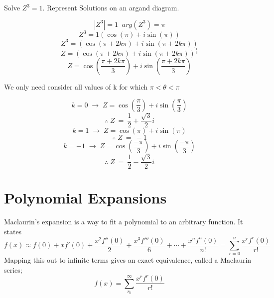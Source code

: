 \documentclass{article}
\begin{document}
Solve \(Z^3=1\). Represent Solutions on an argand diagram.

\[|Z^3|=1 \;\; arg(Z^3)=\pi\]
\[Z^3=1\left(\cos\left(\pi\right)+i\sin\left(\pi\right)\right)\]
\[Z^3=\left(\cos\left(\pi+2k\pi\right)+i\sin\left(\pi+2k\pi\right)\right)\]
\[Z=\left(\cos\left(\pi+2k\pi\right)+i\sin\left(\pi+2k\pi\right)\right)^{\frac{1}{3}}\]
\[Z=\cos\left(\frac{\pi+2k\pi}{3}\right)+i\sin\left(\frac{\pi+2k\pi}{3}\right)\]

\noindent We only need consider all values of k for which \(\pi<\theta<\pi\)

\[k=0 \;\rightarrow\; Z=\cos\left(\frac{\pi}{3}\right)+i\sin\left(\frac{\pi}{3}\right)\]
\[\therefore \; Z \:=\: \frac{1}{2}+\frac{\sqrt{3}}{2}i\]
\[k=1 \;\rightarrow\; Z=\cos\left(\pi\right)+i\sin\left(\pi\right)\]
\[\therefore \; Z \:=\: -1\]
\[k=-1 \;\rightarrow\; Z=\cos\left(\frac{-\pi}{3}\right)+i\sin\left(\frac{-\pi}{3}\right)\]
\[\therefore \; Z \:=\: \frac{1}{2}-\frac{\sqrt{3}}{2}i\]

\begin{center}
\end{center}

\section{Polynomial Expansions}

Maclaurin's expansion is a way to fit a polynomial to an arbitrary function. It
states \[f(x) \approx f(0) + xf'(0) + \frac{x^2f''(0)}{2} +
    \frac{x^3f'''(0)}{6} + \cdots + \frac{x^nf^n(0)}{n!} = \sum_{r=0}^{n}
\frac{x^rf^r(0)}{r!}\] Mapping this out to infinite terms gives an exact
equivalence, called a Maclaurin series; \[f(x) = \sum_{r_0}^{\infty}
\frac{x^rf^r(0)}{r!}\]
\end{document}

